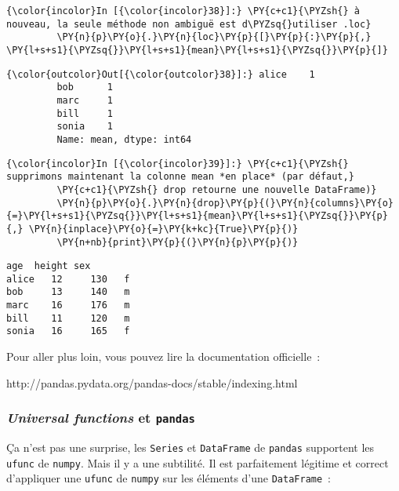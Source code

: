     \begin{Verbatim}[commandchars=\\\{\}]
{\color{incolor}In [{\color{incolor}38}]:} \PY{c+c1}{\PYZsh{} à nouveau, la seule méthode non ambiguë est d\PYZsq{}utiliser .loc}
         \PY{n}{p}\PY{o}{.}\PY{n}{loc}\PY{p}{[}\PY{p}{:}\PY{p}{,} \PY{l+s+s1}{\PYZsq{}}\PY{l+s+s1}{mean}\PY{l+s+s1}{\PYZsq{}}\PY{p}{]}
\end{Verbatim}


\begin{Verbatim}[commandchars=\\\{\}]
{\color{outcolor}Out[{\color{outcolor}38}]:} alice    1
         bob      1
         marc     1
         bill     1
         sonia    1
         Name: mean, dtype: int64
\end{Verbatim}
            
    \begin{Verbatim}[commandchars=\\\{\}]
{\color{incolor}In [{\color{incolor}39}]:} \PY{c+c1}{\PYZsh{} supprimons maintenant la colonne mean *en place* (par défaut,}
         \PY{c+c1}{\PYZsh{} drop retourne une nouvelle DataFrame)}
         \PY{n}{p}\PY{o}{.}\PY{n}{drop}\PY{p}{(}\PY{n}{columns}\PY{o}{=}\PY{l+s+s1}{\PYZsq{}}\PY{l+s+s1}{mean}\PY{l+s+s1}{\PYZsq{}}\PY{p}{,} \PY{n}{inplace}\PY{o}{=}\PY{k+kc}{True}\PY{p}{)}
         \PY{n+nb}{print}\PY{p}{(}\PY{n}{p}\PY{p}{)}
\end{Verbatim}


    \begin{Verbatim}[commandchars=\\\{\}]
       age  height sex
alice   12     130   f
bob     13     140   m
marc    16     176   m
bill    11     120   m
sonia   16     165   f

    \end{Verbatim}

    Pour aller plus loin, vous pouvez lire la documentation officielle~:

http://pandas.pydata.org/pandas-docs/stable/indexing.html

    \hypertarget{universal-functions-et-pandas}{%
\subsubsection{\texorpdfstring{\emph{Universal functions} et
\texttt{pandas}}{Universal functions et pandas}}\label{universal-functions-et-pandas}}

    Ça n'est pas une surprise, les \texttt{Series} et \texttt{DataFrame} de
\texttt{pandas} supportent les \texttt{ufunc} de \texttt{numpy}. Mais il
y a une subtilité. Il est parfaitement légitime et correct d'appliquer
une \texttt{ufunc} de \texttt{numpy} sur les éléments d'une
\texttt{DataFrame}~:

